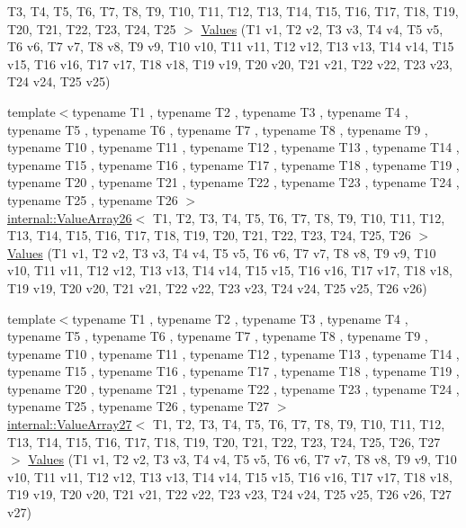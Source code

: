 \begin{DoxyCompactItemize}
\-T3, \-T4, \-T5, \-T6, \-T7, \-T8, \-T9, \*
\-T10, \-T11, \-T12, \-T13, \-T14, \-T15, \*
\-T16, \-T17, \-T18, \-T19, \-T20, \-T21, \*
\-T22, \-T23, \-T24, \-T25 $>$ \hyperlink{namespacetesting_a74baf6524bda9b5799e313541b4816ea}{\-Values} (\-T1 v1, \-T2 v2, \-T3 v3, \-T4 v4, \-T5 v5, \-T6 v6, \-T7 v7, \-T8 v8, \-T9 v9, \-T10 v10, \-T11 v11, \-T12 v12, \-T13 v13, \-T14 v14, \-T15 v15, \-T16 v16, \-T17 v17, \-T18 v18, \-T19 v19, \-T20 v20, \-T21 v21, \-T22 v22, \-T23 v23, \-T24 v24, \-T25 v25)
\item 
{\footnotesize template$<$typename T1 , typename T2 , typename T3 , typename T4 , typename T5 , typename T6 , typename T7 , typename T8 , typename T9 , typename T10 , typename T11 , typename T12 , typename T13 , typename T14 , typename T15 , typename T16 , typename T17 , typename T18 , typename T19 , typename T20 , typename T21 , typename T22 , typename T23 , typename T24 , typename T25 , typename T26 $>$ }\\\hyperlink{classtesting_1_1internal_1_1ValueArray26}{internal\-::\-Value\-Array26}$<$ \-T1, \-T2, \*
\-T3, \-T4, \-T5, \-T6, \-T7, \-T8, \-T9, \*
\-T10, \-T11, \-T12, \-T13, \-T14, \-T15, \*
\-T16, \-T17, \-T18, \-T19, \-T20, \-T21, \*
\-T22, \-T23, \-T24, \-T25, \-T26 $>$ \hyperlink{namespacetesting_aeca27a322529e5bbd6331e40c810a123}{\-Values} (\-T1 v1, \-T2 v2, \-T3 v3, \-T4 v4, \-T5 v5, \-T6 v6, \-T7 v7, \-T8 v8, \-T9 v9, \-T10 v10, \-T11 v11, \-T12 v12, \-T13 v13, \-T14 v14, \-T15 v15, \-T16 v16, \-T17 v17, \-T18 v18, \-T19 v19, \-T20 v20, \-T21 v21, \-T22 v22, \-T23 v23, \-T24 v24, \-T25 v25, \-T26 v26)
\item 
{\footnotesize template$<$typename T1 , typename T2 , typename T3 , typename T4 , typename T5 , typename T6 , typename T7 , typename T8 , typename T9 , typename T10 , typename T11 , typename T12 , typename T13 , typename T14 , typename T15 , typename T16 , typename T17 , typename T18 , typename T19 , typename T20 , typename T21 , typename T22 , typename T23 , typename T24 , typename T25 , typename T26 , typename T27 $>$ }\\\hyperlink{classtesting_1_1internal_1_1ValueArray27}{internal\-::\-Value\-Array27}$<$ \-T1, \-T2, \*
\-T3, \-T4, \-T5, \-T6, \-T7, \-T8, \-T9, \*
\-T10, \-T11, \-T12, \-T13, \-T14, \-T15, \*
\-T16, \-T17, \-T18, \-T19, \-T20, \-T21, \*
\-T22, \-T23, \-T24, \-T25, \-T26, \-T27 $>$ \hyperlink{namespacetesting_a089ea706f6cdde715d03ab42aa3099d3}{\-Values} (\-T1 v1, \-T2 v2, \-T3 v3, \-T4 v4, \-T5 v5, \-T6 v6, \-T7 v7, \-T8 v8, \-T9 v9, \-T10 v10, \-T11 v11, \-T12 v12, \-T13 v13, \-T14 v14, \-T15 v15, \-T16 v16, \-T17 v17, \-T18 v18, \-T19 v19, \-T20 v20, \-T21 v21, \-T22 v22, \-T23 v23, \-T24 v24, \-T25 v25, \-T26 v26, \-T27 v27)

\end{DoxyCompactItemize}
